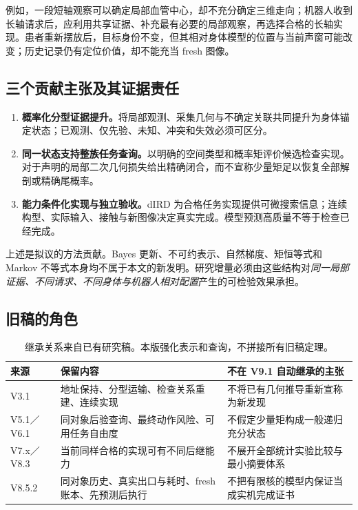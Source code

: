 \documentclass[UTF8,fontset=fandol,11pt,a4paper]{ctexart}
\theoremstyle{plain}
\theoremstyle{definition}
\theoremstyle{remark}
\numberwithin{equation}{section}
\begin{document}
例如，一段短轴观察可以确定局部血管中心，却不充分确定三维走向；机器人收到长轴请求后，应利用共享证据、补充最有必要的局部观察，再选择合格的长轴实现。患者重新摆放后，目标身份不变，但其相对身体模型的位置与当前声窗可能改变；历史记录仍有定位价值，却不能充当 fresh 图像。

\subsection{三个贡献主张及其证据责任}
\begin{enumerate}
\item \textbf{概率化分型证据提升。}将局部观测、采集几何与不确定关联共同提升为身体锚定状态；已观测、仅先验、未知、冲突和失效必须可区分。
\item \textbf{同一状态支持整族任务查询。}以明确的空间类型和概率矩评价候选检查实现。对于声明的局部二次几何损失给出精确闭合，而不宣称少量矩足以恢复全部解剖或精确尾概率。
\item \textbf{能力条件化实现与独立验收。}dIRD 为合格任务实现提供可微搜索信息；连续构型、实际输入、接触与新图像决定真实完成。模型预测高质量不等于检查已经完成。
\end{enumerate}
上述是拟议的方法贡献。Bayes 更新、不可约表示、自然梯度、矩恒等式和 Markov 不等式本身均不属于本文的新发明。研究增量必须由这些结构对\emph{同一局部证据、不同请求、不同身体与机器人相对配置}产生的可检验效果承担。

\subsection{旧稿的角色}
\begin{table}[htbp]\centering\small
\begin{tabularx}{\linewidth}{P{22mm}YY}\toprule
来源 & 保留内容 & 不在 V9.1 自动继承的主张\\\midrule
V3.1 & 地址保持、分型运输、检查关系重建、连续实现 & 不将已有几何推导重新宣称为新发现\\
V5.1／V6.1 & 同对象后验查询、最终动作风险、可用任务自由度 & 不假定少量矩构成一般递归充分状态\\
V7.x／V8.3 & 当前同样合格的实现可有不同后继能力 & 不展开全部统计实验比较与最小摘要体系\\
V8.5.2 & 同对象历史、真实出口与耗时、fresh 账本、先预测后执行 & 不把有限核的模型内保证当成实机完成证书\\\bottomrule
\end{tabularx}
\caption{继承关系来自已有研究稿\cite{v31,v61,v852}。本版强化表示和查询，不拼接所有旧稿定理。}
\end{table}
\end{document}
